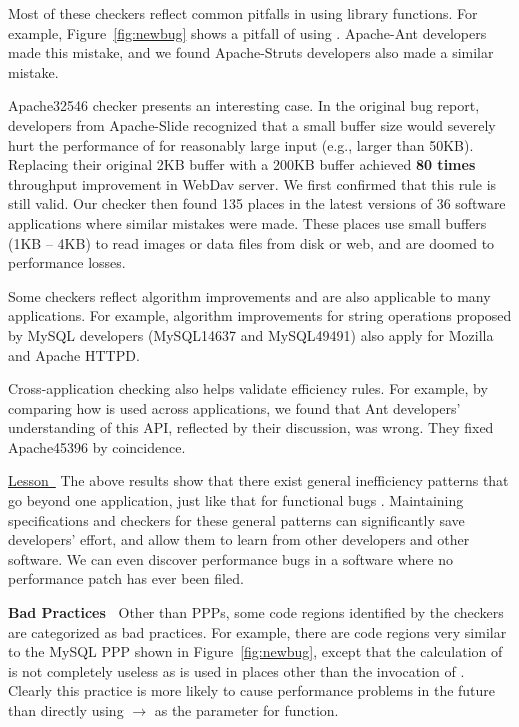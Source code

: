 Most of these checkers reflect common pitfalls in using
library functions. For example, Figure~\ref{fig:newbug} shows a pitfall
of using . Apache-Ant developers made this
mistake, and we found Apache-Struts developers also made a similar mistake.

Apache32546 checker presents an interesting case. In the original 
bug report, developers from Apache-Slide recognized that
a small buffer size would severely hurt the performance of 
for reasonably large input
(e.g., larger than 50KB). Replacing their original
2KB buffer with a 200KB buffer achieved {\bf 80 times} throughput 
improvement in WebDav server. We first confirmed that this rule is
still valid. Our checker then found 135 places
in the latest versions of 36 software applications where similar mistakes were made.
These places use small buffers (1KB -- 4KB) to read images or data
files from disk or web, and are doomed to performance losses.

Some checkers reflect algorithm improvements and are also applicable to
many applications. For example, algorithm improvements for string operations 
proposed by MySQL developers (MySQL14637 and MySQL49491) also apply for
Mozilla and Apache HTTPD.


Cross-application checking also helps validate efficiency rules.
For example, by comparing how 
is used across applications, we found that Ant developers'
understanding of this API, reflected by their discussion, 
was wrong. They fixed Apache45396 by coincidence.

\underline{Lesson\ } 
The above results show that there exist general inefficiency patterns that
go beyond one application, just like that for functional
bugs \citep{billpugh}. 
Maintaining specifications and checkers for these general patterns can 
significantly save developers' effort, and allow them
to learn from other developers and other software. 
We can even discover performance bugs in a software where no
performance patch has ever been filed.

\vspace{0.05in}
{\bf Bad Practices\ } 
Other than PPPs, some code regions identified by the 
checkers are categorized as bad practices.
For example, there are code regions very similar to
the MySQL PPP shown in Figure~\ref{fig:newbug}, except that the calculation of
 is not completely useless as  is used in places other than 
the invocation of .
Clearly this practice is more likely to cause performance problems
in the future than directly using
$\rightarrow$ as the parameter
for  function.

